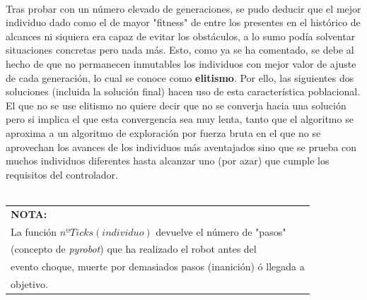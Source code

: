 \documentclass[12pt,spanish]{article}
\begin{document}
\\
Tras probar con un número elevado de generaciones, se pudo deducir que el mejor individuo dado como el de mayor "fitness" de entre los presentes en el histórico de alcances ni siquiera era capaz de evitar los obstáculos, a lo sumo podía solventar situaciones concretas pero nada más. Esto, como ya se ha comentado, se debe al hecho de que no permanecen inmutables los individuos con mejor valor de ajuste de cada generación, lo cual se conoce como \textbf{elitismo}. Por ello, las siguientes dos soluciones (incluida la solución final) hacen uso de esta característica poblacional. El que no se use elitismo no quiere decir que no se converja hacia una solución pero si implica el que esta convergencia sea muy lenta, tanto que el algoritmo se aproxima a un algoritmo de exploración por fuerza bruta en el que no se aprovechan los avances de los individuos más aventajados sino que se prueba con muchos individuos diferentes hasta alcanzar uno (por azar) que cumple los requisitos del controlador.
\\
\\
\begin{tabular}{|l|}
\hline
\textbf{NOTA:}\\
La función $nºTicks(individuo)$ devuelve el número de "pasos"\\
(concepto de \textit{pyrobot}) que ha realizado el robot antes del\\
evento choque, muerte por demasiados pasos (inanición) ó llegada a\\
objetivo.\\
\hline
\end{tabular}
\end{document}
